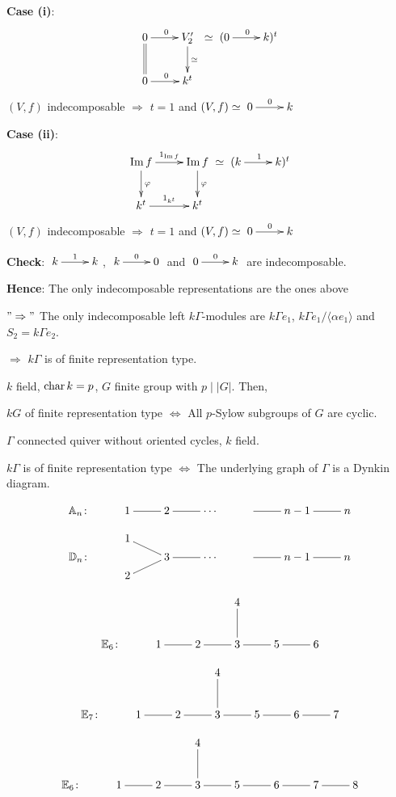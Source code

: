 \begin{exam}
\textbf{Case (i)}:
\[\xymatrix{
0 \ar[r]^0\ar@{=}[d] & V'_2\ar[d]^\simeq\\
0 \ar[r]^0 & k^t} \simeq \xymatrix{(0\ar[r]^0 & k)^t}\]
$(V,f)$ indecomposable $\Rightarrow$ $t = 1$ and $(V,f)\simeq
\xymatrix{0\ar[r]^0 & k}$ 

\textbf{Case (ii)}: 
\[\xymatrix{
\Im f \ar[r]^{1_{\Im f}}\ar[d]^\varphi & \Im f\ar[d]^\varphi\\
k^t \ar[r]^{1_{k^t}} & k^t} \simeq \xymatrix{(k\ar[r]^1 & k)^t}\]
$(V,f)$ indecomposable $\Rightarrow$ $t = 1$ and $(V,f)\simeq
\xymatrix{0\ar[r]^0 & k}$ 

\textbf{Check}: $\xymatrix{k \ar[r]^1 & k}$, $\xymatrix{k\ar[r]^0 & 0}$ and
$\xymatrix{0 \ar[r]^0 & k}$ are indecomposable. 

\textbf{Hence}: The only indecomposable representations are the ones
above  

$"\Rightarrow"$ The only indecomposable left $k\Gamma$-modules
are $k\Gamma e_1$, $k\Gamma e_1/\langle \alpha e_1\rangle$ and $S_2 =
k\Gamma e_2$. 

$\Rightarrow$ $k\Gamma$ is of finite representation type. 
\end{exam}

\begin{thm}
$k$ field, $\operatorname{char}\nolimits k = p$, $G$ finite group with $p\mid |G|$. Then,

$kG$ of finite representation type $\Leftrightarrow$ All $p$-Sylow
subgroups of $G$ are cyclic.
\end{thm}

\begin{thm}
$\Gamma$ connected quiver without oriented cycles, $k$  field.

$k\Gamma$ is of finite representation type $\Leftrightarrow$ The
underlying graph of $\Gamma$ is a Dynkin diagram.

\[\xymatrix{\mathbb{A}_n\colon & 1\ar@{-}[r] & 2\ar@{-}[r] & \cdots &
    \ar@{-}[r] & n-1 \ar@{-}[r] & n}\]

\[\xymatrix@R=3pt{
& 1\ar@{-}[dr] &  & & & & \\
\mathbb{D}_n\colon &  & 3\ar@{-}[r] & \cdots &  \ar@{-}[r] & n-1 \ar@{-}[r] & n\\
& 2\ar@{-}[ur] & & & & & }\]

\[\xymatrix{
& & & 4\ar@{-}[d] & & \\
\mathbb{E}_6\colon & 1\ar@{-}[r] & 2\ar@{-}[r] & 3\ar@{-}[r] &
   5 \ar@{-}[r] & 6}\]

\[\xymatrix{
& & & 4\ar@{-}[d] & & & \\
\mathbb{E}_7\colon & 1\ar@{-}[r] & 2\ar@{-}[r] & 3\ar@{-}[r] &
   5 \ar@{-}[r] & 6 \ar@{-}[r] & 7}\]

\[\xymatrix{
& & & 4\ar@{-}[d] & & & &\\
\mathbb{E}_6\colon & 1\ar@{-}[r] & 2\ar@{-}[r] & 3\ar@{-}[r] &
   5 \ar@{-}[r] & 6 \ar@{-}[r] & 7 \ar@{-}[r] & 8}\]
\end{thm}
